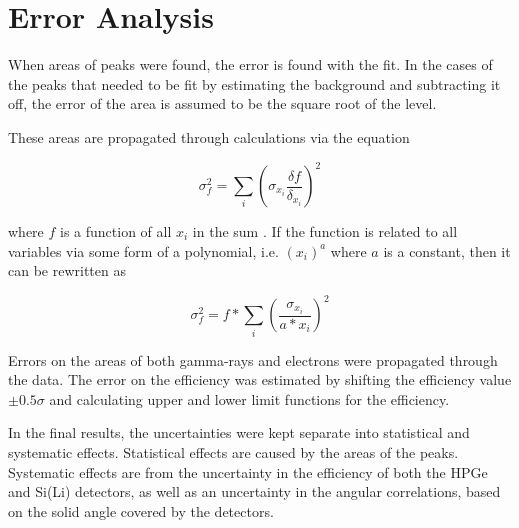

\section{Error Analysis}

When areas of peaks were found, the error is found with the fit. In the cases of the peaks that needed to be fit by estimating the background and subtracting it off, the error of the area is assumed to be the square root of the level.

These areas are propagated through calculations via the equation

\begin{equation}
    \sigma_{f}^2=\sum_{i}\left(\sigma_{x_i}\frac{\delta f}{\delta_{x_i}}\right)^2
\end{equation}

where $f$ is a function of all $x_i$ in the sum \citep{bevington03:_error}. If the function is related to all variables via some form of a polynomial, i.e. $(x_i)^a$ where $a$ is a constant, then it can be rewritten as

\begin{equation}
    \sigma_{f}^2=f*\sum_{i}\left(\frac{\sigma_{x_i}}{a*x_i}\right)^2
\end{equation}

Errors on the areas of both gamma-rays and electrons were propagated through the data. The error on the efficiency was estimated by shifting the efficiency value $\pm0.5\sigma$ and calculating upper and lower limit functions for the efficiency. 

In the final results, the uncertainties were kept separate into statistical and systematic effects. Statistical effects are caused by the areas of the peaks. Systematic effects are from the uncertainty in the efficiency of both the HPGe and Si(Li) detectors, as well as an uncertainty in the angular correlations, based on the solid angle covered by the detectors.